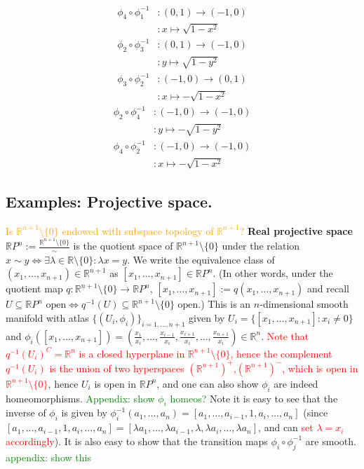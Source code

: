 \documentclass[a4paper]{article}
\theoremstyle{definition} \newtheorem*{definition}{Definition}
\theoremstyle{definition} \newtheorem*{definitions}{Definitions}
\theoremstyle{plain} \newtheorem{theorem}{Theorem}[section]
\theoremstyle{plain} \newtheorem{proposition}[theorem]{Proposition}
\theoremstyle{plain} \newtheorem{corollary}[theorem]{Corollary}
\theoremstyle{plain} \newtheorem{lemma}[theorem]{Lemma}
\theoremstyle{plain} \newtheorem{example}[theorem]{Example}
\newcommand{\checkCorrect}[1]{\textcolor{red}{#1}}
\newcommand{\question}[1]{\textcolor{orange}{#1}}
\newcommand{\finish}[1]{\textcolor{green}{#1}}
\newcommand{\defn}[1]{\textbf{#1}}
\newcommand{\realnos}{\mathbb{R}}
\begin{document}
\begin{align*}
\phi_4 \circ \phi_1^{-1} & : (0,1) \to (-1, 0) \\
& : x \mapsto \sqrt{1-x^2}
\end{align*}
\begin{align*}
\phi_2 \circ \phi_3^{-1} & : (0,1) \to (-1, 0) \\
& : y \mapsto \sqrt{1-y^2}
\end{align*}
\begin{align*}
\phi_3 \circ \phi_2^{-1} & : (-1,0) \to (0,1)\\
& : x \mapsto -\sqrt{1-x^2}
\end{align*}
\begin{align*}
\phi_2 \circ \phi_4^{-1} & : (-1,0) \to (-1,0)\\
& : y \mapsto -\sqrt{1-y^2}
\end{align*}
\begin{align*}
\phi_4 \circ \phi_2^{-1} & : (-1,0) \to (-1,0)\\
& : x \mapsto -\sqrt{1-x^2}
\end{align*}

\subsection{Examples: Projective space.}

\question{Is $\realnos^{n+1}\setminus \{0\}$ endowed with subspace topology of $\realnos^{n+1}$?}
\defn{Real projective space} $\realnos P^n := \frac{\realnos^{n+1}\setminus \{0\}}{\sim}$ is the quotient space of $\realnos^{n+1}\setminus \{0\}$ under the relation $x\sim y \iff \exists \lambda \in \realnos \setminus \{0\} : \lambda x=y$. We write the equivalence class of $(x_1, \ldots, x_{n+1})\in \realnos^{n+1}$ as $[x_1, \ldots, x_{n+1}]\in \realnos P^n$. (In other words, under the quotient map $q:\realnos^{n+1}\setminus \{0\}\to \realnos P^n$, $[x_1, \ldots, x_{n+1}]:=q(x_1, \ldots, x_{n+1})$ and recall $U \subseteq \realnos P^n \textrm{ open} \iff q^{-1}(U) \subseteq \realnos^{n+1}\setminus \{0\} \textrm{ open}$.) This is an $n$-dimensional smooth manifold with atlas $\{(U_i, \phi_i)\}_{i=1, \ldots, n+1}$ given by $U_i=\{[x_1, \ldots, x_{n+1}]: x_i\neq 0\}$ and $\phi_i([x_1, \ldots, x_{n+1}])=(\frac{x_1}{x_i}, \ldots , \frac{x_{i-1}}{x_i}, \frac{x_{i+1}}{x_i}, \ldots, \frac{x_{n+1}}{x_i})\in \realnos^n$. \checkCorrect{Note that $q^{-1}(U_i)^C=\realnos^n$ is a closed hyperplane in $\realnos^{n+1}\setminus \{0\}$, hence the complement $q^{-1}(U_i)$ is the union of two hyperspaces $(\realnos^{n+1})^+$,$(\realnos^{n+1})^-$, which is open in $\realnos^{n+1}\setminus \{0\}$}, hence $U_i$ is open in $\realnos P^n$, and one can also show $\phi_i$ are indeed homeomorphisms. \finish{Appendix: show $\phi_i$ homeos?} Note it is easy to see that the inverse of $\phi_i$ is given by $\phi_i^{-1}(a_1, \ldots, a_n)=[a_1, \ldots, a_{i-1}, 1, a_{i}, \ldots, a_n]$ (since $[a_1, \ldots, a_{i-1}, 1, a_{i}, \ldots, a_n]=[\lambda a_1, \ldots, \lambda a_{i-1}, \lambda, \lambda a_{i}, \ldots, \lambda a_n]$, and can \checkCorrect{set $\lambda=x_i$ accordingly}). It is also easy to show that the transition maps $\phi_i\circ \phi_j^{-1}$ are smooth. \finish{appendix: show this}
\end{document}
